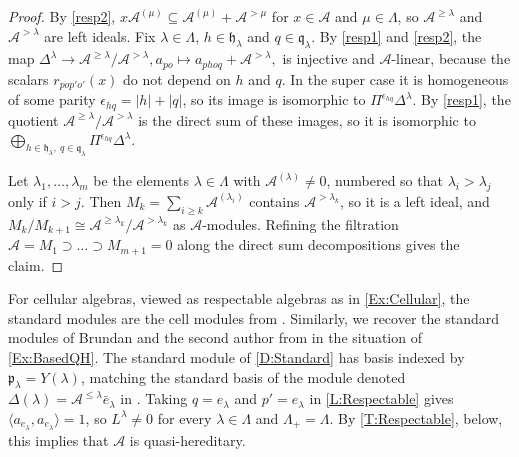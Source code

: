 \documentclass[a4paper,11pt]{amsart}
\let\<\langle
\let\>\rangle
\numberwithin{equation}{subsection}
\theoremstyle{definition}
\theoremstyle{theorem}
\theoremstyle{remark}
\newcommand\CA{\mathcal{A}}
\newcommand\plam[1][\lambda]{\mathfrak{p}_{#1}}
\newcommand\hlam[1][\lambda]{\mathfrak{h}_{#1}}
\newcommand\qlam[1][\lambda]{\mathfrak{q}_{#1}}
\begin{document}
  \begin{proof}
    By \autoref{resp2}, $x\CA^{(\mu)}\subseteq\CA^{(\mu)}+\CA^{>\mu}$ for
    $x\in\CA$ and $\mu\in\Lambda$, so $\CA^{\ge\lambda}$ and $\CA^{>\lambda}$
    are left ideals. Fix $\lambda\in\Lambda$, $h\in\hlam$ and $q\in\qlam$. By \autoref{resp1} and
    \autoref{resp2}, the map
    $
      \Delta^\lambda\longrightarrow\CA^{\ge\lambda}/\CA^{>\lambda},
      a_{po}\longmapsto a_{phoq}+\CA^{>\lambda},
    $
    is injective and $\CA$-linear, because the scalars $r_{pop'o'}(x)$ do not depend on $h$
    and $q$. In the super case it is homogeneous of some parity $\epsilon_{hq}=|h|+|q|$, so its image is
    isomorphic to $\Pi^{\epsilon_{hq}}\Delta^\lambda$. By \autoref{resp1}, the quotient
    $\CA^{\ge\lambda}/\CA^{>\lambda}$ is the direct sum of these images, so it is
    isomorphic to $\bigoplus_{h\in\hlam,\ q\in\qlam}\Pi^{\epsilon_{hq}}\Delta^\lambda$.

    Let $\lambda_1,\dots,\lambda_m$ be the elements $\lambda\in\Lambda$ with
    $\CA^{(\lambda)}\ne0$, numbered so that
    $\lambda_i>\lambda_j$ only if $i>j$. Then
    $M_k=\sum_{i\ge k}\CA^{(\lambda_i)}$ contains $\CA^{>\lambda_k}$, so it is a left
    ideal, and $M_k/M_{k+1}\cong\CA^{\ge\lambda_k}/\CA^{>\lambda_k}$ as
    $\CA$-modules. Refining the filtration $\CA=M_1\supset\dots\supset
    M_{m+1}=0$ along the direct sum decompositions gives the claim.
  \end{proof}


  \begin{Example}\label{Ex:StandardBasedQH}
    For cellular algebras, viewed as respectable algebras as in
    \autoref{Ex:Cellular}, the standard modules are the cell modules
    from \cite{GrahamLehrer:Cellular}. Similarly, we recover the
    standard modules of Brundan and the second author from
    \cite{BrundanStroppel:Semiinfinite} in the situation of
    \autoref{Ex:BasedQH}.  The standard module of \autoref{D:Standard}
    has basis indexed by $\plam=Y(\lambda)$, matching the standard basis
    of the module denoted $\Delta(\lambda)=\CA^{\le\lambda}\bar
    e_\lambda$ in \cite[(5.2)]{BrundanStroppel:Semiinfinite}. Taking
    $q=e_\lambda$ and $p'=e_\lambda$ in \autoref{L:Respectable} gives
    $\<a_{e_\lambda},a_{e_\lambda}\>=1$, so $L^\lambda\ne0$
    for every $\lambda\in\Lambda$ and $\Lambda_+=\Lambda$.
    By \autoref{T:Respectable}, below, this implies that $\CA$ is
    quasi-hereditary.
  \end{Example}
\end{document}
